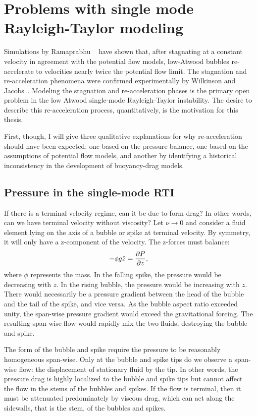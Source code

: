 \section{Problems with single mode Rayleigh-Taylor modeling}

Simulations by Ramaprabhu \etal ~\cite{Ramaprabhu2006} have shown that, after stagnating at a constant velocity in agreement with the potential flow models, low-Atwood bubbles re-accelerate to velocities nearly twice the potential flow limit.
The stagnation and re-acceleration phenomena were confirmed experimentally by Wilkinson and Jacobs~\cite{Wilkinson2007}.
Modeling the stagnation and re-acceleration phases is the primary open problem in the low Atwood single-mode Rayleigh-Taylor instability.
The desire to describe this re-acceleration process, quantitatively, is the motivation for this thesis.

First, though, I will give three qualitative explanations for why re-acceleration should have been expected: one based on the pressure balance, one based on the assumptions of potential flow models, and another by identifying a historical inconsistency in the development of buoyancy-drag models.

\subsection{Pressure in the single-mode RTI}

If there is a terminal velocity regime, can it be due to form drag?
In other words, can we have terminal velocity without viscosity?
Let $\nu \rightarrow 0$ and consider a fluid element lying on the axis
of a bubble or spike at terminal velocity.
By symmetry, it will only have a z-component of the velocity.
The z-forces must balance:
\begin{equation}
- \phi g \hat{z} = \frac{\partial P}{\partial z} ,
\end{equation}
where $\phi$ represents the mass.
In the falling spike, the pressure would be decreasing with $z$.
In the rising bubble, the pressure would be increasing with $z$.
There would necessarily be a pressure gradient between the head of the bubble and the tail of the spike, and vice versa.
As the bubble aspect ratio exceeded unity, the span-wise pressure gradient would exceed the gravitational forcing.
The resulting span-wise flow would rapidly mix the two fluids, destroying the bubble and spike.

The form of the bubble and spike require the pressure to be reasonably homogeneous span-wise.
Only at the bubble and spike tips do we observe a span-wise flow: the displacement of stationary fluid by the tip.
In other words, the pressure drag is highly localized to the bubble and spike tips but cannot affect the flow in the stems of the bubbles and spikes.
If the flow is terminal, then it must be attenuated predominately by viscous drag, which can act along the sidewalls, that is the stem, of the bubbles and spikes.

